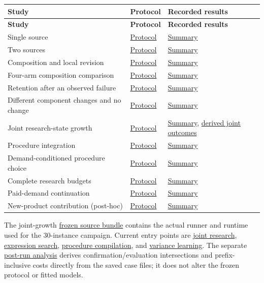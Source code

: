 \documentclass[11pt,a4paper]{article}
\begin{document}
\begingroup\small\setlength{\tabcolsep}{4pt}
\renewcommand{\arraystretch}{1.18}
\begin{longtable}{@{}>{\raggedright\arraybackslash}p{}>{\raggedright\arraybackslash}p{}>{\raggedright\arraybackslash}p{}@{}}
\toprule
\textbf{Study} & \textbf{Protocol} & \textbf{Recorded results} \\
\midrule\endfirsthead
\toprule
\textbf{Study} & \textbf{Protocol} & \textbf{Recorded results} \\
\midrule\endhead
\bottomrule\endlastfoot
Single source & \hyperlink{artifact-10}{Protocol} & \hyperlink{artifact-11}{Summary} \\
Two sources & \hyperlink{artifact-12}{Protocol} & \hyperlink{artifact-13}{Summary} \\
Composition and local revision & \hyperlink{artifact-14}{Protocol} & \hyperlink{artifact-15}{Summary} \\
Four-arm composition comparison & \hyperlink{artifact-16}{Protocol} & \hyperlink{artifact-17}{Summary} \\
Retention after an observed failure & \hyperlink{artifact-18}{Protocol} & \hyperlink{artifact-19}{Summary} \\
Different component changes and no change & \hyperlink{artifact-20}{Protocol} & \hyperlink{artifact-21}{Summary} \\
Joint research-state growth & \hyperlink{artifact-22}{Protocol} & \hyperlink{artifact-23}{Summary}, \hyperlink{artifact-24}{derived joint outcomes} \\
Procedure integration & \hyperlink{artifact-25}{Protocol} & \hyperlink{artifact-26}{Summary} \\
Demand-conditioned procedure choice & \hyperlink{artifact-27}{Protocol} & \hyperlink{artifact-28}{Summary} \\
Complete research budgets & \hyperlink{artifact-29}{Protocol} & \hyperlink{artifact-30}{Summary} \\
Paid-demand continuation & \hyperlink{artifact-31}{Protocol} & \hyperlink{artifact-32}{Summary} \\
New-product contribution (post-hoc) & \hyperlink{artifact-33}{Protocol} & \hyperlink{artifact-34}{Summary} \\
\end{longtable}
\endgroup

The joint-growth \hyperlink{artifact-35}{frozen source bundle}
contains the actual runner and runtime used for the 30-instance campaign. Current
entry points are \hyperlink{artifact-36}{joint research},
\hyperlink{artifact-37}{expression search},
\hyperlink{artifact-38}{procedure compilation}, and
\hyperlink{artifact-39}{variance learning}.
The separate \hyperlink{artifact-40}{post-run analysis} derives
confirmation/evaluation intersections and prefix-inclusive costs directly from
the saved case files; it does not alter the frozen protocol or fitted models.
\end{document}
